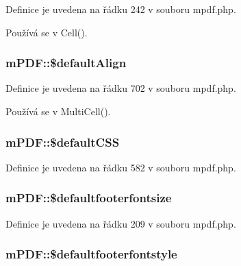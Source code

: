 Definice je uvedena na řádku 242 v souboru mpdf.\-php.



Používá se v Cell().

\hypertarget{classm_p_d_f_a86d7b3f5efa4b477e5214a95e820a24b}{
\subsubsection[{\$default\-Align}]{\setlength{\rightskip}{0pt plus 5cm}m\-P\-D\-F\-::\$default\-Align}}\label{classm_p_d_f_a86d7b3f5efa4b477e5214a95e820a24b}


Definice je uvedena na řádku 702 v souboru mpdf.\-php.



Používá se v Multi\-Cell().

\hypertarget{classm_p_d_f_acb715c73bf9392442e51b3776bc83dc0}{
\subsubsection[{\$default\-C\-S\-S}]{\setlength{\rightskip}{0pt plus 5cm}m\-P\-D\-F\-::\$default\-C\-S\-S}}\label{classm_p_d_f_acb715c73bf9392442e51b3776bc83dc0}


Definice je uvedena na řádku 582 v souboru mpdf.\-php.

\hypertarget{classm_p_d_f_a99aac9194b80ff9e4bb53b867775f917}{
\subsubsection[{\$defaultfooterfontsize}]{\setlength{\rightskip}{0pt plus 5cm}m\-P\-D\-F\-::\$defaultfooterfontsize}}\label{classm_p_d_f_a99aac9194b80ff9e4bb53b867775f917}


Definice je uvedena na řádku 209 v souboru mpdf.\-php.

\hypertarget{classm_p_d_f_a767e9801cebfe76eeec56d23ff494436}{
\subsubsection[{\$defaultfooterfontstyle}]{\setlength{\rightskip}{0pt plus 5cm}m\-P\-D\-F\-::\$defaultfooterfontstyle}}\label{classm_p_d_f_a767e9801cebfe76eeec56d23ff494436}


